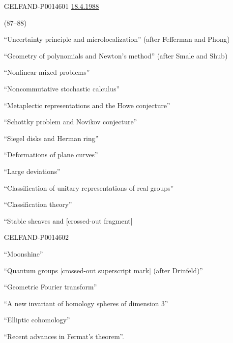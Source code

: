\begin{GelfandAdjacentEvidence}{GELFAND-P001460}{1}
\underline{18.4.1988}\qquad {}

 (\(87\text{--}88\))

\quad “Uncertainty principle and microlocalization” (after Fefferman and Phong)

“Geometry of polynomials and Newton’s method” (after Smale and Shub)

“Nonlinear mixed problems”

“Noncommutative stochastic calculus”

“Metaplectic representations and the Howe conjecture”

“Schottky problem and Novikov conjecture”

\quad “Siegel disks and Herman ring”

“Deformations of plane curves”

“Large deviations”

“Classification of unitary representations of real groups”

“Classification theory”

“Stable sheaves and [crossed-out fragment]
\end{GelfandAdjacentEvidence}
\begin{GelfandAdjacentEvidence}{GELFAND-P001460}{2}


“Moonshine”

\quad “Quantum groups [crossed-out superscript mark] (after Drinfeld)”
\end{GelfandAdjacentEvidence}


\quad “Geometric Fourier transform”

“A new invariant of homology spheres of dimension \(3\)”

“Elliptic cohomology”

“Recent advances in Fermat’s theorem”.


